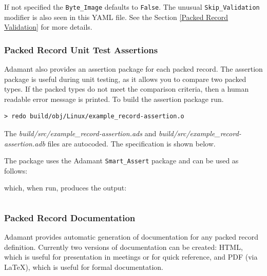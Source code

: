 
If not specified the \texttt{Byte\_Image} defaults to \texttt{False}. The unusual \texttt{Skip\_Validation} modifier is also seen in this YAML file. See the Section \ref{Packed Record Validation} for more details.

\subsubsection{Packed Record Unit Test Assertions}\label{Packed Record Unit Test Assertions}

Adamant also provides an assertion package for each packed record. The assertion package is useful during unit testing, as it allows you to compare two packed types. If the packed types do not meet the comparison criteria, then a human readable error message is printed. To build the assertion package run.

\vspace{5mm} %
\begin{verbatim}
> redo build/obj/Linux/example_record-assertion.o
\end{verbatim}
\vspace{5mm} %

The \textit{build/src/example\_record-assertion.ads} and \textit{build/src/example\_record-assertion.adb} files are autocoded. The specification is shown below.


The package uses the Adamant \texttt{Smart\_Assert} package and can be used as follows:


which, when run, produces the output:

\vspace{5mm} %
\inputminted{text}{../example_architecture/record_assertion/output.txt}
\vspace{5mm} %

\subsubsection{Packed Record Documentation}

Adamant provides automatic generation of documentation for any packed record definition. Currently two versions of documentation can be created: HTML, which is useful for presentation in meetings or for quick reference, and PDF (via \LaTeX), which is useful for formal documentation.\\


